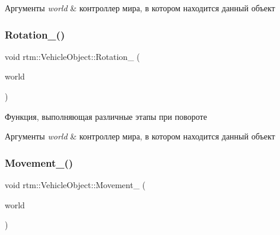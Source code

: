 \begin{DoxyParams}{Аргументы}
{\em world} & контроллер мира, в котором находится данный объект \\
\hline
\end{DoxyParams}
\mbox{\label{classrtm_1_1_vehicle_object_a6961d03a7e8a805a9bd4422a8d0c1985}} 
\subsubsection{\texorpdfstring{Rotation\+\_\+()}{Rotation\_()}}
{\footnotesize\ttfamily void rtm\+::\+Vehicle\+Object\+::\+Rotation\+\_\+ (\begin{DoxyParamCaption}\item[{\hyperlink{classrtm_1_1_world_controller}{World\+Controller} $\ast$const}]{world }\end{DoxyParamCaption})\hspace{0.3cm}{\ttfamily [private]}}



Функция, выполняющая различные этапы при повороте 


\begin{DoxyParams}{Аргументы}
{\em world} & контроллер мира, в котором находится данный объект \\
\hline
\end{DoxyParams}
\mbox{\label{classrtm_1_1_vehicle_object_a0db960e75dbcb12d028b239e441ea0ed}} 
\subsubsection{\texorpdfstring{Movement\+\_\+()}{Movement\_()}}
{\footnotesize\ttfamily void rtm\+::\+Vehicle\+Object\+::\+Movement\+\_\+ (\begin{DoxyParamCaption}\item[{\hyperlink{classrtm_1_1_world_controller}{World\+Controller} $\ast$const}]{world }\end{DoxyParamCaption})\hspace{0.3cm}{\ttfamily [private]}}




